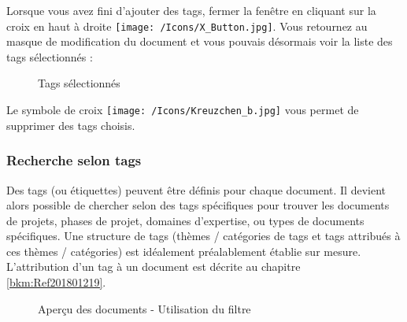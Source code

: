Lorsque vous avez fini d'ajouter des tags, fermer la fenêtre en cliquant sur la croix en haut à droite \texttt{[image: /Icons/X\_Button.jpg]}. Vous retournez au masque de modification du document et vous pouvais désormais voir la liste des tags sélectionnés :

\begin{figure}[H]
\caption{Tags sélectionnés}
\end{figure}

Le symbole de croix \texttt{[image: /Icons/Kreuzchen\_b.jpg]}  vous permet de supprimer des tags choisis.




\subsubsection{Recherche selon tags}
\label{bkm:Ref442275849}

Des tags (ou étiquettes) peuvent être définis pour chaque document. Il devient alors possible de chercher selon des tags spécifiques pour trouver les documents de projets, phases de projet, domaines d'expertise, ou types de documents spécifiques. Une structure de tags (thèmes / catégories de tags et tags attribués à ces thèmes / catégories) est idéalement préalablement établie sur mesure. L'attribution d'un tag à un document est décrite au chapitre \ref{bkm:Ref201801219}.

\begin{figure}[H]
\caption{Aperçu des documents - Utilisation du filtre}
\end{figure}

